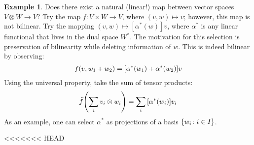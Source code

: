 \documentclass{article}
\theoremstyle{definition}
\newtheorem*{Example*}{Example}
\theoremstyle{remark}
\theoremstyle{underline}
\theoremstyle{underline}
\begin{document}
	\begin{Example*}
		Does there exist a natural (linear!) map between vector spaces $V \otimes W \to V$? Try the map $f\colon V \times W \to V$, where $(v, w) \mapsto v$; however, this map is not bilinear. Try the mapping $(v,w) \mapsto [\alpha^*(w)]v$, where $\alpha^*$ is any linear functional that lives in the dual space $W^*$. The motivation for this selection is preservation of	bilinearity while deleting information of $w$. This is indeed bilinear by observing:
		\begin{gather*}
			f(v, w_1 + w_2) = \bqty{\alpha^*(w_1) + \alpha^*(w_2)}v
		\end{gather*}
		Using the universal property, take the sum of tensor products:
		\begin{gather*}
			\tilde f\pqty{\sum_{i} v_i \otimes w_i} = \sum_i \bqty{\alpha^*(w_i)}v_i
		\end{gather*}
		As an example, one can select $\alpha^*$ as projections of a basis $\qty{w_i \colon i \in I}$.
	\end{Example*}
<<<<<<< HEAD
\end{document}
